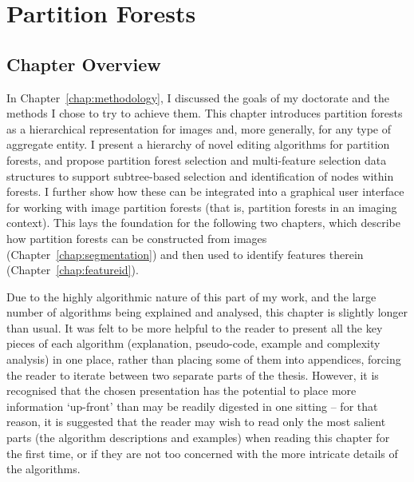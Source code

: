 \chapter{Partition Forests}
\label{chap:ipfs}

\vspace{-1.5\baselineskip}

\enlargethispage*{\baselineskip}

\section{Chapter Overview}

In Chapter~\ref{chap:methodology}, I discussed the goals of my doctorate and the methods I chose to try to achieve them. This chapter introduces partition forests as a hierarchical representation for images and, more generally, for any type of aggregate entity. I present a hierarchy of novel editing algorithms for partition forests, and propose partition forest selection and multi-feature selection data structures to support subtree-based selection and identification of nodes within forests. I further show how these can be integrated into a graphical user interface for working with image partition forests (that is, partition forests in an imaging context). This lays the foundation for the following two chapters, which describe how partition forests can be constructed from images (Chapter~\ref{chap:segmentation}) and then used to identify features therein (Chapter~\ref{chap:featureid}).

Due to the highly algorithmic nature of this part of my work, and the large number of algorithms being explained and analysed, this chapter is slightly longer than usual. It was felt to be more helpful to the reader to present all the key pieces of each algorithm (explanation, pseudo-code, example and complexity analysis) in one place, rather than placing some of them into appendices, forcing the reader to iterate between two separate parts of the thesis. However, it is recognised that the chosen presentation has the potential to place more information `up-front' than may be readily digested in one sitting -- for that reason, it is suggested that the reader may wish to read only the most salient parts (the algorithm descriptions and examples) when reading this chapter for the first time, or if they are not too concerned with the more intricate details of the algorithms.

